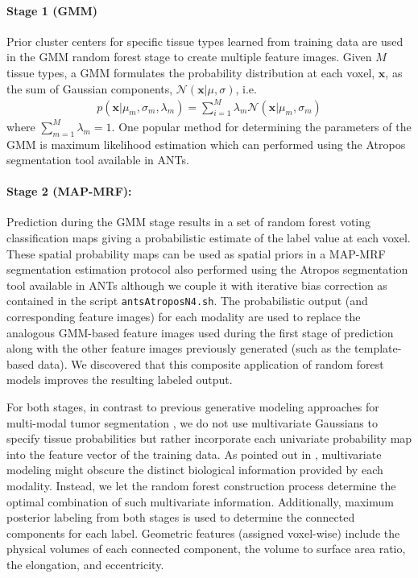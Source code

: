 \documentclass[final,5p,times,twocolumn]{elsarticle}
\begin{document}
\paragraph{Stage 1 (GMM)}
Prior  cluster centers for specific tissue types learned from training data \citep{reynolds2009} are used in the GMM random forest stage to create 
multiple feature images.  
Given $M$ tissue types, a GMM formulates the 
probability distribution at each voxel, $\mathbf{x}$, as the
sum of Gaussian components, $\mathcal{N}(\mathbf{x}|\mu,\sigma)$, i.e.
\begin{align}
p\left(\mathbf{x}|\mu_m,\sigma_m,\lambda_m\right) = \sum_{i=1}^M \lambda_m \mathcal{N}(\mathbf{x}|\mu_m,\sigma_m)
\end{align}
where $\sum_{m=1}^M \lambda_m = 1$.  One popular method for 
determining the parameters of the GMM is maximum likelihood 
estimation which can performed using the Atropos segmentation 
tool \citep{avants2011} available in ANTs.  

\paragraph{Stage 2 (MAP-MRF):}

Prediction during the GMM stage results in a set of random 
forest voting classification maps giving a probabilistic estimate
of the label value at each voxel.  These spatial probability
maps can be used as spatial priors in a MAP-MRF segmentation
estimation protocol also performed using the Atropos segmentation 
tool \citep{avants2011} available in ANTs although we couple
it with iterative bias correction as contained in the script
{\tt antsAtroposN4.sh}.  The probabilistic output (and corresponding
feature images) 
for each modality are used to replace the analogous GMM-based feature images used 
during the first stage of prediction along with the other feature
images previously generated (such as the template-based data).
We discovered that this composite application of random
forest models improves the resulting labeled output.

For both stages, in contrast to previous generative
modeling approaches for multi-modal tumor segmentation 
\citep[e.g.][]{prastawa2003}, we do not use multivariate 
Gaussians to specify tissue probabilities but rather incorporate each
univariate probability map into the feature vector of the training
data.  As pointed out in \cite{menze2010}, multivariate modeling
might obscure the distinct biological information provided by each 
modality.  Instead, we let the random forest construction 
process determine the optimal combination of such multivariate
information.  Additionally, maximum posterior labeling from both stages
is used to determine the connected components for each label.  
Geometric features (assigned voxel-wise) include the physical volumes 
of each connected component, the volume to surface area ratio, 
the elongation, and eccentricity. 
\end{document}
